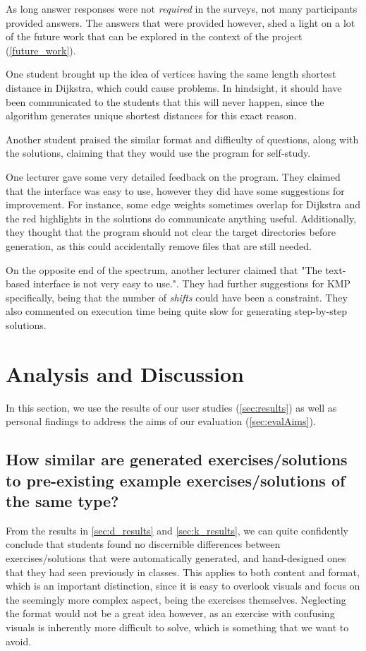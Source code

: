 \documentclass{l4proj}
\begin{document}
As long answer responses were not \emph{required} in the surveys, not many participants provided answers. The answers that were provided however, shed a light on a lot of the future work that can be explored in the context of the project (\autoref{future_work}).

One student brought up the idea of vertices having the same length shortest distance in Dijkstra, which could cause problems. In hindsight, it should have been communicated to the students that this will never happen, since the algorithm generates unique shortest distances for this exact reason. 

Another student praised the similar format and difficulty of questions, along with the solutions, claiming that they would use the program for self-study.

One lecturer gave some very detailed feedback on the program. They claimed that the interface was easy to use, however they did have some suggestions for improvement. For instance, some edge weights sometimes overlap for Dijkstra and the red highlights in the solutions do communicate anything useful. Additionally, they thought that the program should not clear the target directories before generation, as this could accidentally remove files that are still needed.

On the opposite end of the spectrum, another lecturer claimed that "The text-based interface is not very easy to use.". They had further suggestions for KMP specifically, being that the number of \emph{shifts} could have been a constraint. They also commented on execution time being quite slow for generating step-by-step solutions.

\section{Analysis and Discussion}
\label{sec:analysis}

In this section, we use the results of our user studies (\autoref{sec:results}) as well as personal findings to address the aims of our evaluation (\autoref{sec:evalAims}).

\subsection{How similar are generated exercises/solutions to pre-existing example exercises/solutions of the same type?}

From the results in \autoref{sec:d_results} and \autoref{sec:k_results}, we can quite confidently conclude that students found no discernible differences between exercises/solutions that were automatically generated, and hand-designed ones that they had seen previously in classes. This applies to both content and format, which is an important distinction, since it is easy to overlook visuals and focus on the seemingly more complex aspect, being the exercises themselves. Neglecting the format would not be a great idea however, as an exercise with confusing visuals is inherently more difficult to solve, which is something that we want to avoid.
\end{document}

